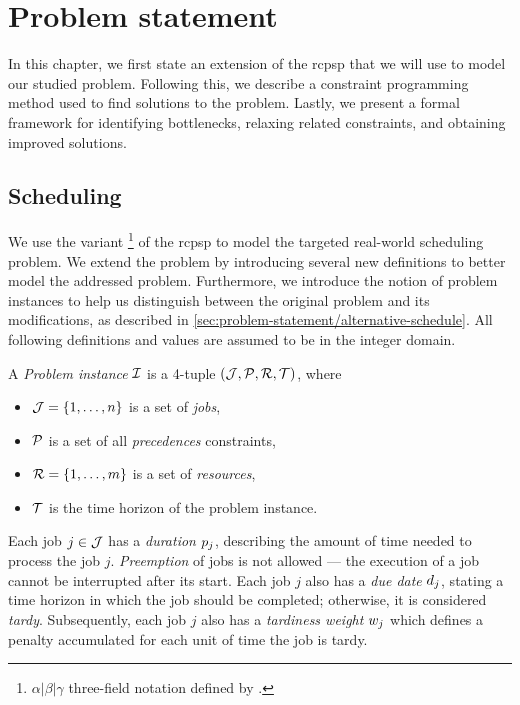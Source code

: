 \chapter{Problem statement} \label{chap:problem-statement}

In this chapter, we first state an extension of the \ac{rcpsp} that we will use to model our studied problem.
Following this, we describe a constraint programming method used to find solutions to the problem.
Lastly, we present a formal framework for identifying bottlenecks, relaxing related constraints,
and obtaining improved solutions.

\section{Scheduling} \label{sec:problem-statement/scheduling}

We use the \Problem{} variant%
\footnote{$\alpha | \beta | \gamma$ three-field notation defined by \citet{Brucker1999}.}
of the \ac{rcpsp} to model the targeted real-world scheduling problem.
We extend the problem by introducing several new definitions to better model the addressed problem.
Furthermore, we introduce the notion of problem instances to help us distinguish between the original problem
and its modifications, as described in \cref{sec:problem-statement/alternative-schedule}.
All following definitions and values are assumed to be in the integer domain.

\begin{defn} \label{def:problem-instance}
A \emph{Problem instance} $\mathcal{I}$ is a 4-tuple $(\mathcal{J}, \mathcal{P}, \mathcal{R}, \mathcal{T})$,
where
\begin{itemize}
    \item $\mathcal{J} = \{1, \dots, n\}$ is a set of \emph{jobs},
    \item $\mathcal{P}$ is a set of all \emph{precedences} constraints,
    \item $\mathcal{R} = \{1, \dots, m\}$ is a set of \emph{resources},
    \item $\mathcal{T}$ is the time horizon of the problem instance.
\end{itemize}
\end{defn}


Each job $j \in \mathcal{J}$ has a \emph{duration} $p_{j}$,
describing the amount of time needed to process the job $j$.
\emph{Preemption} of jobs is not allowed
--- the execution of a job cannot be interrupted after its start.
Each job $j$ also has a \emph{due date} $d_{j}$,
stating a time horizon in which the job should be completed;
otherwise, it is considered \emph{tardy}.
Subsequently, each job $j$ also has a \emph{tardiness weight} $w_{j}$
which defines a penalty accumulated for each unit of time the job is tardy.

